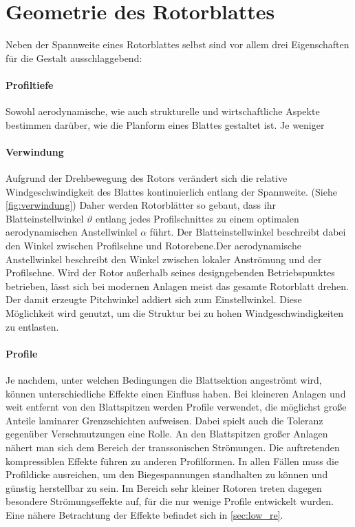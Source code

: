 \newpage %

\section{Geometrie des Rotorblattes}
Neben der Spannweite eines Rotorblattes selbst sind vor allem drei Eigenschaften für die Gestalt ausschlaggebend:

\paragraph{Profiltiefe}
Sowohl aerodynamische, wie auch strukturelle und wirtschaftliche Aspekte bestimmen darüber, wie die Planform eines Blattes gestaltet ist. Je weniger 

\paragraph{Verwindung}
Aufgrund der Drehbewegung des Rotors verändert sich die relative Windgeschwindigkeit des Blattes kontinuierlich entlang der Spannweite. (Siehe \cref{fig:verwindung}) Daher werden Rotorblätter so gebaut, dass ihr Blatteinstellwinkel \(\vartheta\) entlang jedes Profilschnittes zu einem optimalen aerodynamischen Anstellwinkel \(\alpha\) führt. Der Blatteinstellwinkel beschreibt dabei den Winkel zwischen Profilsehne und Rotorebene.Der aerodynamische Anstellwinkel beschreibt den Winkel zwischen lokaler Anströmung und der Profilsehne. 
Wird der Rotor außerhalb seines designgebenden Betriebspunktes betrieben, lässt sich bei modernen Anlagen meist das gesamte Rotorblatt drehen. Der damit erzeugte Pitchwinkel addiert sich zum Einstellwinkel. Diese Möglichkeit wird genutzt, um die Struktur bei zu hohen Windgeschwindigkeiten zu entlasten. \cite{hau_rotorblatter_2016}

\paragraph{Profile}
Je nachdem, unter welchen Bedingungen die Blattsektion angeströmt wird, können unterschiedliche Effekte einen Einfluss haben. Bei kleineren Anlagen und weit entfernt von den Blattspitzen werden Profile verwendet, die möglichst große Anteile laminarer Grenzschichten aufweisen. Dabei spielt auch die Toleranz gegenüber Verschmutzungen eine Rolle. \cite{hau_bauformen_2016} An den Blattspitzen großer Anlagen nähert man sich dem Bereich der transsonischen Strömungen. Die auftretenden kompressiblen Effekte führen zu anderen Profilformen. \cite{anderson_fundamentals_2017} In allen Fällen muss die Profildicke ausreichen, um den Biegespannungen standhalten zu können und günstig herstellbar zu sein. Im Bereich sehr kleiner Rotoren treten dagegen besondere Strömungseffekte auf, für die nur wenige Profile entwickelt wurden.\cite{buchholz_erarbeitung_2020} Eine nähere Betrachtung der Effekte befindet sich in \cref{sec:low_re}.

